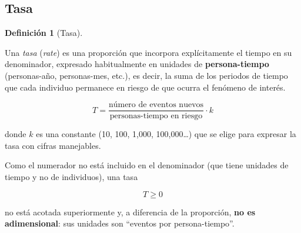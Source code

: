 \documentclass[
  spanish,
  a4paper,
]{scrreport}
\theoremstyle{definition}
\theoremstyle{definition}
\newtheorem{definition}{Definición}[chapter]
\theoremstyle{remark}
\begin{document}
\subsection{Tasa}\label{tasa}

\begin{definition}[Tasa]\protect\hypertarget{def-descriptivos-tasa}{}\label{def-descriptivos-tasa}

Una \emph{tasa} (\emph{rate}) es una proporción que incorpora
explícitamente el tiempo en su denominador, expresado habitualmente en
unidades de \textbf{persona-tiempo} (personas-año, personas-mes, etc.),
es decir, la suma de los periodos de tiempo que cada individuo permanece
en riesgo de que ocurra el fenómeno de interés.

\[T = \frac{\mbox{número de eventos nuevos}}{\mbox{personas-tiempo en riesgo}}\cdot k\]

donde \(k\) es una constante (10, 100, 1,000, 100,000\ldots) que se
elige para expresar la tasa con cifras manejables.

\end{definition}

\begin{tcolorbox}[enhanced jigsaw, arc=.35mm, bottomrule=.15mm, bottomtitle=1mm, breakable, colback=white, colbacktitle=quarto-callout-important-color!10!white, colframe=quarto-callout-important-color-frame, coltitle=black, left=2mm, leftrule=.75mm, opacityback=0, opacitybacktitle=0.6, rightrule=.15mm, title=\textcolor{quarto-callout-important-color}{\faExclamation}\hspace{0.5em}{Importante}, titlerule=0mm, toprule=.15mm, toptitle=1mm]

Como el numerador no está incluido en el denominador (que tiene unidades
de tiempo y no de individuos), una tasa

\[T \geq 0\]

no está acotada superiormente y, a diferencia de la proporción,
\textbf{no es adimensional}: sus unidades son ``eventos por
persona-tiempo''.

\end{tcolorbox}
\end{document}
